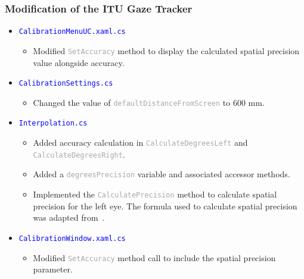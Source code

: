 \documentclass{beamer}
\begin{document}
    \begin{frame}
        \frametitle{Modification of the ITU Gaze Tracker}

        \begin{itemize}
            \item \texttt{\textcolor{blue}{CalibrationMenuUC.xaml.cs}} \\
                \begin{itemize}
                    \item Modified \texttt{\textcolor{darkgray}{SetAccuracy}}
                    method to display the calculated spatial precision value
                    alongside accuracy.
                \end{itemize}

            \item \texttt{\textcolor{blue}{CalibrationSettings.cs}}
                \begin{itemize}
                    \item Changed the value of
                    \texttt{\textcolor{darkgray}{defaultDistanceFromScreen}} to 600 mm.
                \end{itemize}

            \item \texttt{\textcolor{blue}{Interpolation.cs}}
                \begin{itemize}
                    \item Added accuracy calculation in
                    \texttt{\textcolor{darkgray}{CalculateDegreesLeft}} and
                    \texttt{\textcolor{darkgray}{CalculateDegreesRight}}.

                    \item Added a \texttt{\textcolor{darkgray}{degreesPrecision}}
                    variable and associated accessor methods.

                    \item Implemented the \texttt{\textcolor{darkgray}{CalculatePrecision}}
                    method to calculate spatial precision for the left eye.
                    The formula used to calculate spatial precision was adapted
                    from~\cite{Ho}.
                \end{itemize}

            \item \texttt{\textcolor{blue}{CalibrationWindow.xaml.cs}}
                \begin{itemize}
                    \item Modified \texttt{\textcolor{darkgray}{SetAccuracy}}
                    method call to include the spatial precision parameter.
                \end{itemize}

        \end{itemize}

    \end{frame}
    
\end{document}
